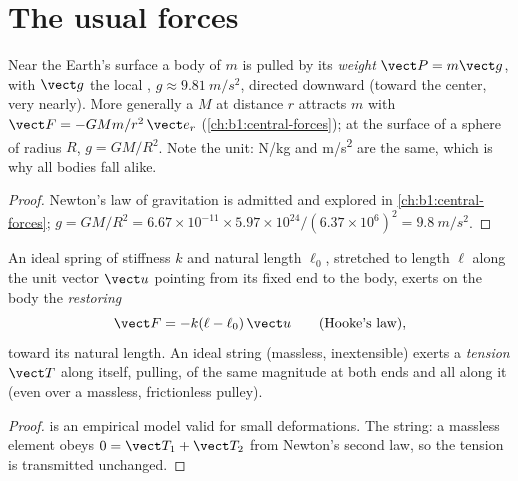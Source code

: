 \section{The usual forces}

\begin{proposition}\label{prop:b1:newton-dynamics:weight}
Near the Earth's surface a body of  $m$ is pulled by its
\emph{weight} $\vect P = m\vect g$, with $\vect g$ the local , $g \approx \qty{9.81}{m/s^2}$, directed downward (toward the
center, very nearly). More generally a  $M$ at distance $r$ attracts
$m$ with $\vect F = -GMm/r^2\,\vect e_r$ (\cref{ch:b1:central-forces});
at the surface of a sphere of radius $R$, $g = GM/R^2$. Note the unit:
\unit{N/kg} and \unit{m/s^2} are the same, which is why all bodies fall
alike.
\end{proposition}

\begin{proof}
Newton's law of gravitation is admitted and explored in
\cref{ch:b1:central-forces}; $g = GM/R^2 = 6.67\times10^{-11} \times
5.97\times10^{24}/(6.37\times10^6)^2 = \qty{9.8}{m/s^2}$.
\end{proof}

\begin{proposition}\label{prop:b1:newton-dynamics:springstring}
An ideal spring of stiffness $k$ and natural length $\ell_0$, stretched
to length $\ell$ along the unit vector $\vect u$ pointing from its fixed
end to the body, exerts on the body the \emph{restoring }
\[
\vect F = -k(\ell - \ell_0)\,\vect u \qquad (\text{Hooke's law}),
\]
toward its natural length. An ideal string (massless, inextensible)
exerts a \emph{tension} $\vect T$ along itself, pulling, of the same
magnitude at both ends and all along it (even over a massless,
frictionless pulley).
\end{proposition}

\begin{proof}
 is an empirical model valid for small deformations. The
string: a massless element obeys $0 = \vect T_1 + \vect T_2$ from
Newton's second law, so the tension is transmitted unchanged.
\end{proof}

